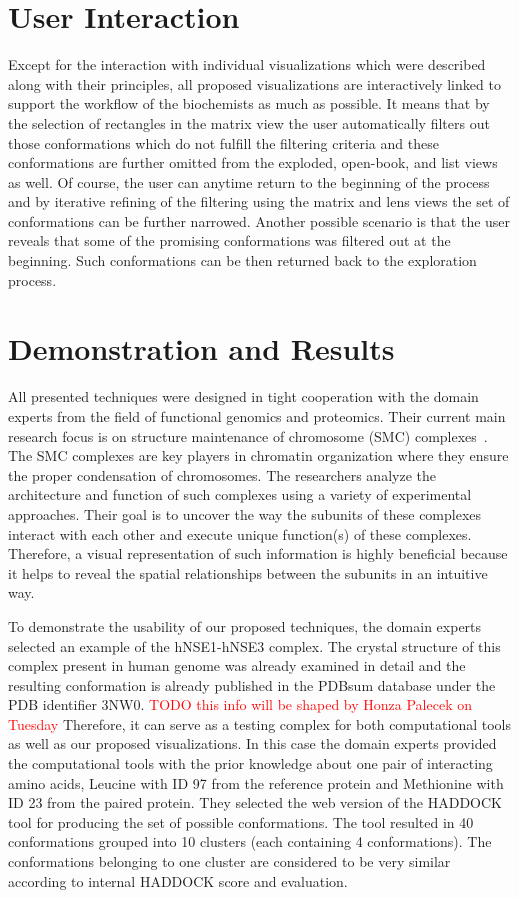 \documentclass[journal]{vgtc}                %
\begin{document}
\section{User Interaction}
Except for the interaction with individual visualizations which were described along with their principles, all proposed visualizations are interactively linked to support the workflow of the biochemists as much as possible.
It means that by the selection of rectangles in the matrix view the user automatically filters out those conformations which do not fulfill the filtering criteria and these conformations are further omitted from the exploded, open-book, and list views as well.
Of course, the user can anytime return to the beginning of the process and by iterative refining of the filtering using the matrix and lens views the set of conformations can be further narrowed.
Another possible scenario is that the user reveals that some of the promising conformations was filtered out at the beginning.
Such conformations can be then returned back to the exploration process.

\section{Demonstration and Results}
All presented techniques were designed in tight cooperation with the domain experts from the field of functional genomics and proteomics.
Their current main research focus is on structure maintenance of chromosome (SMC) complexes~\cite{Hudson2011,Guerineau2012,Palecek2015}. 
The SMC complexes are key players in chromatin organization where they ensure the proper condensation of chromosomes. 
The researchers analyze the architecture and function of such complexes using a variety of experimental approaches. 
Their goal is to uncover the way the subunits of these complexes interact with each other and execute unique function(s) of these complexes. 
Therefore, a visual representation of such information is highly beneficial because it helps to reveal the spatial relationships between the subunits in an intuitive way.

To demonstrate the usability of our proposed techniques, the domain experts selected an example of the hNSE1-hNSE3 complex.
The crystal structure of this complex present in human genome was already examined in detail and the resulting conformation is already published in the PDBsum database under the PDB identifier 3NW0. 
\textcolor{red}{TODO this info will be shaped by Honza Palecek on Tuesday}
Therefore, it can serve as a testing complex for both computational tools as well as our proposed visualizations.
In this case the domain experts provided the computational tools with the prior knowledge about one pair of interacting amino acids, Leucine with ID 97 from the reference protein and Methionine with ID 23 from the paired protein.
They selected the web version of the HADDOCK tool for producing the set of possible conformations. 
The tool resulted in 40 conformations grouped into 10 clusters (each containing 4 conformations).
The conformations belonging to one cluster are considered to be very similar according to internal HADDOCK score and evaluation.
\end{document}

